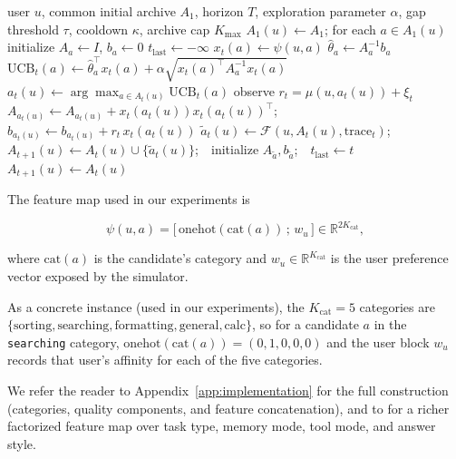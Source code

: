 \documentclass{article} %
\begin{document}
\begin{algorithm}[t]
\caption{Per-user personalized routing over a growing archive.}
\label{alg:router}
\begin{algorithmic}[1]
\Require user $u$, common initial archive $A_1$, horizon $T$, exploration parameter $\alpha$, gap threshold $\tau$, cooldown $\kappa$, archive cap $K_{\max}$
\State $A_1(u) \gets A_1$; for each $a \in A_1(u)$ initialize $A_a \gets I$, $b_a \gets 0$
\State $t_{\mathrm{last}} \gets -\infty$
        \State $x_t(a) \gets \psi(u,a)$ 
        \State $\hat\theta_a \gets A_a^{-1} b_a$
        \State $\mathrm{UCB}_t(a) \gets \hat\theta_a^\top x_t(a) + \alpha \sqrt{x_t(a)^\top A_a^{-1} x_t(a)}$
    \EndFor
    \State $a_t(u) \gets \arg\max_{a \in A_t(u)} \mathrm{UCB}_t(a)$
    \State observe $r_t = \mu(u, a_t(u)) + \xi_t$
    \State $A_{a_t(u)} \gets A_{a_t(u)} + x_t(a_t(u)) x_t(a_t(u))^\top$;\quad $b_{a_t(u)} \gets b_{a_t(u)} + r_t \, x_t(a_t(u))$
        \State $\tilde a_t(u) \gets \mathcal{F}(u, A_t(u), \mathrm{trace}_t)$;\ \ $A_{t+1}(u) \gets A_t(u) \cup \{\tilde a_t(u)\}$;\ \ initialize $A_{\tilde a}, b_{\tilde a}$;\ \ $t_{\mathrm{last}} \gets t$
    \Else
        \State $A_{t+1}(u) \gets A_t(u)$
    \EndIf
\EndFor
\end{algorithmic}
\end{algorithm}

The feature map used in our experiments is

\begin{equation}
\label{eq:method-feat}
\psi(u,a) = \big[\,\mathrm{onehot}(\mathrm{cat}(a))\,;\, w_u\,\big] \in \mathbb{R}^{2K_{\mathrm{cat}}},
\end{equation}

where $\mathrm{cat}(a)$ is the candidate's category and $w_u \in \mathbb{R}^{K_{\mathrm{cat}}}$ is the user preference vector exposed by the simulator.

As a concrete instance (used in our experiments), the $K_{\mathrm{cat}}=5$ categories are $\{\text{sorting}, \text{searching}, \text{formatting}, \text{general}, \text{calc}\}$, so for a candidate $a$ in the \texttt{searching} category, $\mathrm{onehot}(\mathrm{cat}(a))=(0,1,0,0,0)$ and the user block $w_u$ records that user's affinity for each of the five categories.

We refer the reader to Appendix~\ref{app:implementation} for the full construction (categories, quality components, and feature concatenation), and to \citet{jin2026personalizing} for a richer factorized feature map over task type, memory mode, tool mode, and answer style.
\end{document}
